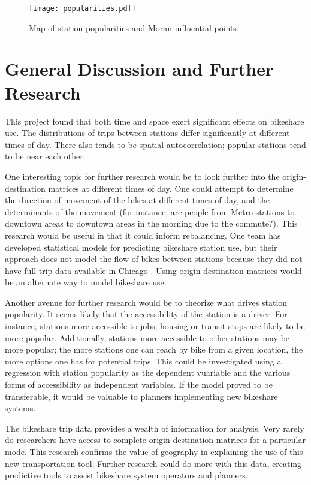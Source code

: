 \documentclass[letterpaper,11pt]{article}
\begin{document}
\begin{figure}[t]
  \texttt{[image: popularities.pdf]}
  \caption{\label{fig:map} Map of station popularities and Moran
    influential points.}
\end{figure}

\section{General Discussion and Further Research}

This project found that both time and space exert significant effects
on bikeshare use. The distributions of trips between stations differ
significantly at different times of day. There also tends to be
spatial autocorrelation; popular stations tend to be near each other.

One interesting topic for further research would be to look further
into the origin-destination matrices at different times of day. One
could attempt to determine the direction of movement of the bikes at
different times of day, and the determinants of the movement (for
instance, are people from Metro stations to downtown areas to downtown
areas in the morning due to the commute?). This research would be useful
in that it could inform rebalancing. One team has developed
statistical models for predicting bikeshare station use, but their
approach does not model the flow of bikes between stations because
they did not have full trip data available in Chicago
\autocite{Dempsey2013}. Using origin-destination matrices would be an
alternate way to model bikeshare use.

Another avenue for further research would be to theorize what drives
station popularity. It seems likely that the accessibility of the
station is a driver. For instance, stations more accessible to jobs,
housing or transit stops are likely to be more popular. Additionally,
stations more accessible to other stations may be more popular; the
more stations one can reach by bike from a given location, the more
options one has for potential trips. This could be investigated using
a regression with station popularity as the dependent vuariable and the
various forms of accessibility as independent variables. If the model
proved to be transferable, it would be valuable to planners
implementing new bikeshare systems.

The bikeshare trip data provides a wealth of information for
analysis. Very rarely do researchers have access to complete
origin-destination matrices for a particular mode. This research
confirms the value of geography in explaining the use of this new
transportation tool. Further research could do more with this data,
creating predictive tools to assist bikeshare system operators and
planners.
\end{document}
